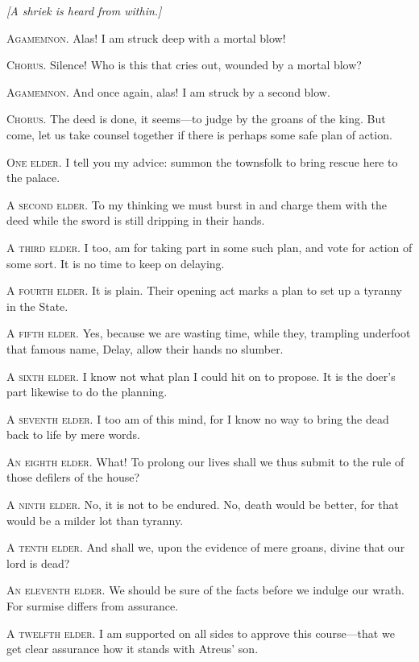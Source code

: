 \documentclass[12pt]{article}
\begin{document}
\begin{center}
\textit{[A shriek is heard from within.]}
\end{center}

\textsc{Agamemnon.} Alas! I am struck deep with a mortal blow!

\textsc{Chorus.} Silence! Who is this that cries out, wounded by a mortal blow?

\textsc{Agamemnon.} And once again, alas! I am struck by a second blow.

\textsc{Chorus.} The deed is done, it seems---to judge by the groans of the king. But come, let us take counsel together if there is perhaps some safe plan of action.

\textsc{One elder.} I tell you my advice: summon the townsfolk to bring rescue here to the palace.

\textsc{A second elder.} To my thinking we must burst in and charge them with the deed while the sword is still dripping in their hands.

\textsc{A third elder.} I too, am for taking part in some such plan, and vote for action of some sort. It is no time to keep on delaying.

\textsc{A fourth elder.} It is plain. Their opening act marks a plan to set up a tyranny in the State.

\textsc{A fifth elder.} Yes, because we are wasting time, while they, trampling underfoot that famous name, Delay, allow their hands no slumber.

\textsc{A sixth elder.} I know not what plan I could hit on to propose. It is the doer's part likewise to do the planning.

\textsc{A seventh elder.} I too am of this mind, for I know no way to bring the dead back to life by mere words.

\textsc{An eighth elder.} What! To prolong our lives shall we thus submit to the rule of those defilers of the house?

\textsc{A ninth elder.} No, it is not to be endured. No, death would be better, for that would be a milder lot than tyranny.

\textsc{A tenth elder.} And shall we, upon the evidence of mere groans, divine that our lord is dead?

\textsc{An eleventh elder.} We should be sure of the facts before we indulge our wrath. For surmise differs from assurance.

\textsc{A twelfth elder.} I am supported on all sides to approve this course---that we get clear assurance how it stands with Atreus' son.
\end{document}
